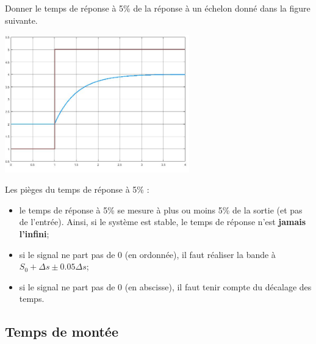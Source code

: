 \documentclass[10pt,fleqn]{article} %
\begin{document}
\begin{exemple}
Donner le temps de réponse à 5\% de la réponse à un échelon donné dans la figure suivante. 


\begin{minipage}[c]{.5\linewidth}
\begin{center}
%
\includegraphics[width=8cm]{images/tr.jpg}
\end{center}
\end{minipage} \hfill
\begin{minipage}[c]{.4\linewidth}
Les pièges du temps de réponse à 5\% :
\begin{itemize}
\item le temps de réponse à 5\% se mesure à plus ou moins 5\% de la sortie (et pas de l'entrée). Ainsi, si le système est stable, le temps de réponse n'est \textbf{jamais l'infini};
\item si le signal ne part pas de 0 (en ordonnée), il faut réaliser la bande à $S_0+\Delta s \pm 0.05\Delta s$;
\item si le signal ne part pas de 0 (en abscisse), il faut tenir compte du décalage des temps.
\end{itemize}
\end{minipage} 
\end{exemple}

\subsection{Temps de montée}
\end{document}
